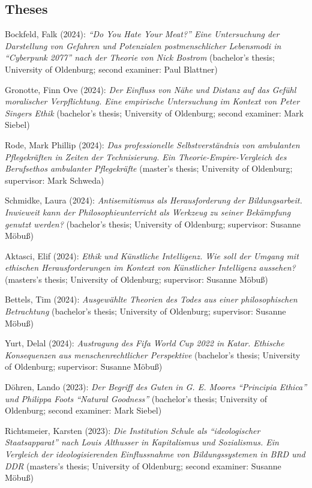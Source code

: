\documentclass[a4paper,10pt]{article}
\newenvironment{literature}{%
   \parskip6pt\parindent0pt\raggedright
   \def\lititem{\hangindent=1cm\hangafter1}}{%
   \par\ignorespaces}
\begin{document}
\subsection*{Theses}
\begin{literature}

\lititem Bockfeld, Falk (2024): \textit{\enquote{Do You Hate Your Meat?} Eine Untersuchung der Darstellung von Gefahren und Potenzialen postmenschlicher Lebensmodi in \enquote{Cyberpunk 2077} nach der Theorie von Nick Bostrom} (bachelor's thesis; University of Oldenburg; second examiner: Paul Blattner)

\lititem Gronotte, Finn Ove (2024): \textit{Der Einfluss von Nähe und Distanz auf das Gefühl moralischer Verpflichtung. Eine empirische Untersuchung im Kontext von Peter Singers Ethik} (bachelor's thesis; University of Oldenburg; second examiner: Mark Siebel)

\lititem Rode, Mark Phillip (2024): \textit{Das professionelle Selbstverständnis von ambulanten Pflegekräften in Zeiten der Technisierung. Ein Theorie-Empire-Vergleich des Berufsethos ambulanter Pflegekräfte} (master's thesis; University of Oldenburg; supervisor: Mark Schweda)

\lititem Schmidke, Laura (2024): \textit{Antisemitismus als Herausforderung der Bildungsarbeit. Inwieweit kann der Philosophieunterricht als Werkzeug zu seiner Bekämpfung genutzt werden?} (bachelor's thesis; University of Oldenburg; supervisor: Susanne Möbuß)

\lititem Aktasci, Elif (2024): \textit{Ethik und Künstliche Intelligenz. Wie soll der Umgang mit ethischen Herausforderungen im Kontext von Künstlicher Intelligenz aussehen?} (masters's thesis; University of Oldenburg; supervisor: Susanne Möbuß)

\lititem Bettels, Tim (2024): \textit{Ausgewählte Theorien des Todes aus einer philosophischen Betrachtung} (bachelor's thesis; University of Oldenburg; supervisor: Susanne Möbuß)

\lititem Yurt, Delal (2024): \textit{Austragung des Fifa World Cup 2022 in Katar. Ethische Konsequenzen aus menschenrechtlicher Perspektive} (bachelor's thesis; University of Oldenburg; supervisor: Susanne Möbuß)

\lititem Döhren, Lando (2023): \textit{Der Begriff des Guten in G. E. Moores \enquote{Principia Ethica} und Philippa Foots \enquote{Natural Goodness}} (bachelor's thesis; University of Oldenburg; second examiner: Mark Siebel)

\lititem Richtsmeier, Karsten (2023): \textit{Die Institution Schule als \enquote{ideologischer Staatsapparat} nach Louis Althusser in Kapitalismus und Sozialismus. Ein Vergleich der ideologisierenden Einflussnahme von Bildungssystemen in BRD und DDR} (masters's thesis; University of Oldenburg; second examiner: Susanne Möbuß)


\end{literature}
\end{document}
